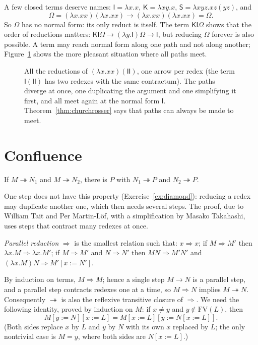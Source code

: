 A few closed terms deserve names: $\mathsf I=\lambda x.x$, $\mathsf K=\lambda xy.x$, $\mathsf S=\lambda xyz.xz(yz)$, and
\[
\Omega=(\lambda x.xx)(\lambda x.xx)\to(\lambda x.xx)(\lambda x.xx)=\Omega .
\]
So $\Omega$ has no normal form: its only reduct is itself. The term $\mathsf K\mathsf I\Omega$ shows that the order of reductions matters: $\mathsf K\mathsf I\Omega\to(\lambda y.\mathsf I)\Omega\to\mathsf I$, but reducing $\Omega$ forever is also possible. A term may reach normal form along one path and not along another; Figure~\ref{fig:lambdagraph} shows the more pleasant situation where all paths meet.

\begin{figure}[ht]
\centering
{}
\caption{All the reductions of $(\lambda x.xx)(\mathsf I\mathsf I)$, one arrow per redex (the term $\mathsf I(\mathsf I\mathsf I)$ has two redexes with the same contractum). The paths diverge at once, one duplicating the argument and one simplifying it first, and all meet again at the normal form $\mathsf I$. Theorem~\ref{thm:churchrosser} says that paths can always be made to meet.}
\label{fig:lambdagraph}
\end{figure}

\section{Confluence}\label{sec:confluence}

\begin{theorem}\label{thm:churchrosser}
If $M\twoheadrightarrow N_1$ and $M\twoheadrightarrow N_2$, there is $P$ with $N_1\twoheadrightarrow P$ and $N_2\twoheadrightarrow P$.
\end{theorem}

One step does not have this property (Exercise~\ref{ex:diamond}): reducing a redex may duplicate another one, which then needs several steps. The proof, due to William Tait and Per Martin-Löf, with a simplification by Masako Takahashi, uses steps that contract many redexes at once.

\begin{definition}\label{def:parallel}
\emph{Parallel reduction} $\Rightarrow$ is the smallest relation such that: $x\Rightarrow x$; if $M\Rightarrow M'$ then $\lambda x.M\Rightarrow\lambda x.M'$; if $M\Rightarrow M'$ and $N\Rightarrow N'$ then $MN\Rightarrow M'N'$ and $(\lambda x.M)N\Rightarrow M'[x:=N']$.
\end{definition}

By induction on terms, $M\Rightarrow M$; hence a single step $M\to N$ is a parallel step, and a parallel step contracts redexes one at a time, so $M\Rightarrow N$ implies $M\twoheadrightarrow N$. Consequently $\twoheadrightarrow$ is also the reflexive transitive closure of $\Rightarrow$. We need the following identity, proved by induction on $M$: if $x\ne y$ and $y\notin\mathrm{FV}(L)$, then
\begin{equation}\label{eq:substlemma}
M[y:=N][x:=L]=M[x:=L][y:=N[x:=L]].
\end{equation}
(Both sides replace $x$ by $L$ and $y$ by $N$ with its own $x$ replaced by $L$; the only nontrivial case is $M=y$, where both sides are $N[x:=L]$.)

